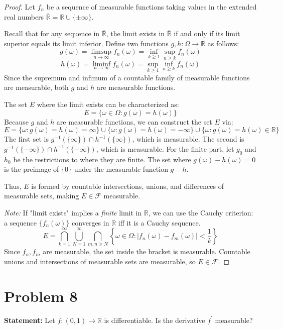 \documentclass[12pt]{article}
\begin{document}
\begin{proof}
Let $f_n$ be a sequence of measurable functions taking values in the extended real numbers $\overline{\mathbb{R}} = \mathbb{R} \cup \{\pm\infty\}$. 

Recall that for any sequence in $\overline{\mathbb{R}}$, the limit exists in $\overline{\mathbb{R}}$ if and only if its limit superior equals its limit inferior. 
Define two functions $g, h : \Omega \rightarrow \overline{\mathbb{R}}$ as follows:
\[
g(\omega) = \limsup_{n \to \infty} f_n(\omega) = \inf_{k \ge 1} \sup_{n \ge k} f_n(\omega)
\]
\[
h(\omega) = \liminf_{n \to \infty} f_n(\omega) = \sup_{k \ge 1} \inf_{n \ge k} f_n(\omega)
\]
Since the supremum and infimum of a countable family of measurable functions are measurable, both $g$ and $h$ are measurable functions. 

The set $E$ where the limit exists can be characterized as:
\[
E = \{\omega \in \Omega : g(\omega) = h(\omega)\}
\]
Because $g$ and $h$ are measurable functions, we can construct the set $E$ via:
\[
E = \{\omega : g(\omega) = h(\omega) = \infty\} \cup \{\omega : g(\omega) = h(\omega) = -\infty\} \cup \{\omega : g(\omega) = h(\omega) \in \mathbb{R}\}
\]
The first set is $g^{-1}(\{\infty\}) \cap h^{-1}(\{\infty\})$, which is measurable. The second is $g^{-1}(\{-\infty\}) \cap h^{-1}(\{-\infty\})$, which is measurable. For the finite part, let $g_0$ and $h_0$ be the restrictions to where they are finite. The set where $g(\omega) - h(\omega) = 0$ is the preimage of $\{0\}$ under the measurable function $g - h$. 

Thus, $E$ is formed by countable intersections, unions, and differences of measurable sets, making $E \in \mathcal{F}$ measurable.

\textit{Note:} If "limit exists" implies a \textit{finite} limit in $\mathbb{R}$, we can use the Cauchy criterion: a sequence $\{f_n(\omega)\}$ converges in $\mathbb{R}$ iff it is a Cauchy sequence.
\[
E = \bigcap_{k=1}^{\infty} \bigcup_{N=1}^{\infty} \bigcap_{m, n \ge N} \left\{\omega \in \Omega : |f_n(\omega) - f_m(\omega)| < \frac{1}{k}\right\}
\]
Since $f_n, f_m$ are measurable, the set inside the bracket is measurable. Countable unions and intersections of measurable sets are measurable, so $E \in \mathcal{F}$.
\end{proof}

\section*{Problem 8}
\textbf{Statement:} Let $f:(0,1)\rightarrow\mathbb{R}$ is differentiable. Is the derivative $f^{\prime}$ measurable?
\end{document}
